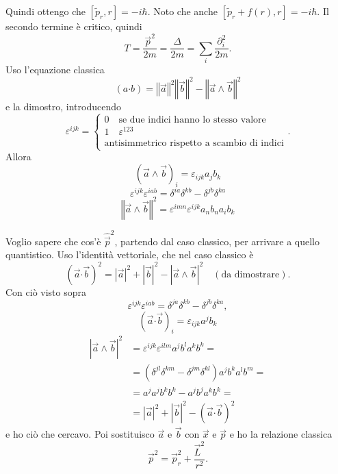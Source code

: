 Quindi ottengo che \( [\tilde{p}_r, r] = -i\hbar \). Noto che anche \( [\tilde{p}_r + f(r), r] = -i\hbar \). Il secondo termine è critico, quindi 
\[
T = \frac{{\vec{p}}^2}{2m} = \frac{\Delta}{2m} = \sum_i \frac{\partial_i^2}{2m}.
\]
Uso l'equazione classica
\[
(a \mathbf{\cdot} b) = \left\Vert \vec{a} \right\Vert^2 \left\Vert \vec{b} \right\Vert^2 - \left\Vert \vec{a} \wedge \vec{b} \right\Vert^2
\]
e la dimostro, introducendo
\[
\varepsilon^{ijk} = \begin{cases}
0 \quad \text{se due indici hanno lo stesso valore} \\
1 \quad \varepsilon^{123} \\
\text{antisimmetrico rispetto a scambio di indici}
\end{cases} .
\]
Allora
\[
\left( \vec{a} \wedge \vec{b} \right)_i = \varepsilon_{ijk} a_j b_k
\]
\[
\varepsilon^{ijk} \varepsilon^{iab} = \delta^{ia}\delta^{kb} - \delta^{jb} \delta^{ka}
\]
\[
\left\Vert \vec{a} \wedge \vec{b} \right\Vert^2 = \varepsilon^{imn} \varepsilon^{ijk} a_n b_n a_i b_k
\]

Voglio sapere che cos'è \( \hat{\vec{p}}^2 \), partendo dal caso classico, per arrivare a quello quantistico. Uso l'identità vettoriale, che nel caso classico è 
\[
(\vec{a} \mathbf{\cdot} \vec{b})^2 = |\vec{a}|^2 + |\vec{b}|^2 - |\vec{a} \wedge \vec{b}|^2 \quad (\text{da dimostrare}).
\]
Con ciò visto sopra
\[
\varepsilon^{ijk} \varepsilon^{iab} = \delta^{ja} \delta^{kb} - \delta^{jb} \delta^{ka},
\]
\[
(\vec{a} \mathbf{\cdot} \vec{b})_i = \varepsilon_{ijk} a^j b_k
\]
\begin{align*}
|\vec{a} \wedge \vec{b}|^2 &= \varepsilon^{ijk} \varepsilon^{ilm} a^j b^l a^k b^k = \\
&= (\delta^{jl} \delta^{km} - \delta^{jm} \delta^{kl}) a^j b^k a^l b^m = \\
&= a^j a^j b^k b^k - a^j b^j a^k b^k = \\
&= |\vec{a}|^2 + |\vec{b}|^2 - (\vec{a} \mathbf{\cdot} \vec{b})^2
\end{align*}
e ho ciò che cercavo. Poi sostituisco \( \vec{a} \) e \( \vec{b} \) con \( \vec{x} \) e \( \vec{p} \) e ho la relazione classica 
\[
\vec{p}^2 = \vec{p}_r^2 + \frac{\vec{L}^2}{r^2}.
\]

